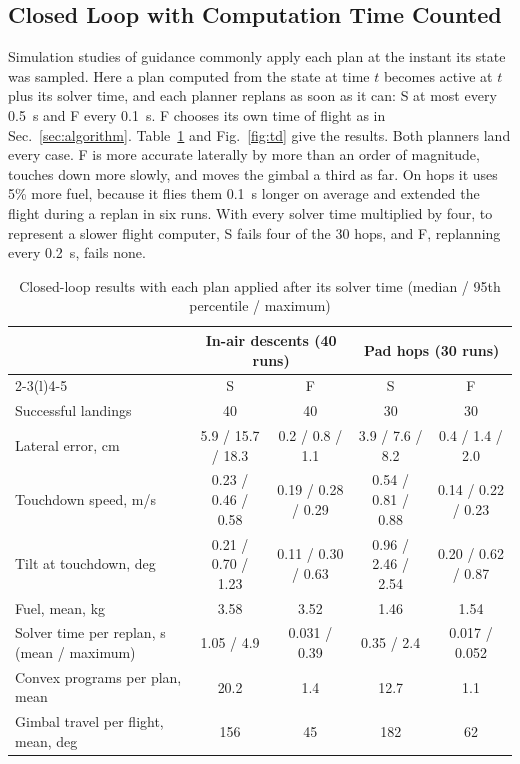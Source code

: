 \documentclass[10pt,letterpaper]{article}
\theoremstyle{aiaa}
\begin{document}
\subsection{Closed Loop with Computation Time Counted}
Simulation studies of guidance commonly apply each plan at the instant its state was sampled. Here a plan computed from the state
at time $t$ becomes active at $t$ plus its solver time, and each planner replans as soon as it can: S at most every 0.5~s and F
every 0.1~s. F chooses its own time of flight as in Sec.~\ref{sec:algorithm}. Table~\ref{tab:closed} and Fig.~\ref{fig:td} give
the results. Both planners land every case. F is more accurate laterally by more than an order of magnitude, touches down more
slowly, and moves the gimbal a third as far. On hops it uses 5\% more fuel, because it flies them 0.1~s longer on average and
extended the flight during a replan in six runs. With every solver time multiplied by four, to represent a slower flight
computer, S fails four of the 30 hops, and F, replanning every 0.2~s, fails none.

\begin{table}[t]\centering
\caption{Closed-loop results with each plan applied after its solver time (median / 95th percentile / maximum)}\label{tab:closed}
\small\setlength{\tabcolsep}{4.5pt}
\begin{tabular}{@{}lcccc@{}}\toprule
 & \multicolumn{2}{c}{In-air descents (40 runs)} & \multicolumn{2}{c}{Pad hops (30 runs)} \\\cmidrule(lr){2-3}\cmidrule(l){4-5}
 & S & F & S & F \\\midrule
Successful landings & 40 & 40 & 30 & 30 \\
Lateral error, cm & 5.9 / 15.7 / 18.3 & 0.2 / 0.8 / 1.1 & 3.9 / 7.6 / 8.2 & 0.4 / 1.4 / 2.0 \\
Touchdown speed, m/s & 0.23 / 0.46 / 0.58 & 0.19 / 0.28 / 0.29 & 0.54 / 0.81 / 0.88 & 0.14 / 0.22 / 0.23 \\
Tilt at touchdown, deg & 0.21 / 0.70 / 1.23 & 0.11 / 0.30 / 0.63 & 0.96 / 2.46 / 2.54 & 0.20 / 0.62 / 0.87 \\
Fuel, mean, kg & 3.58 & 3.52 & 1.46 & 1.54 \\
Solver time per replan, s (mean / maximum) & 1.05 / 4.9 & 0.031 / 0.39 & 0.35 / 2.4 & 0.017 / 0.052 \\
Convex programs per plan, mean & 20.2 & 1.4 & 12.7 & 1.1 \\
Gimbal travel per flight, mean, deg & 156 & 45 & 182 & 62 \\\bottomrule
\end{tabular}
\end{table}
\end{document}
